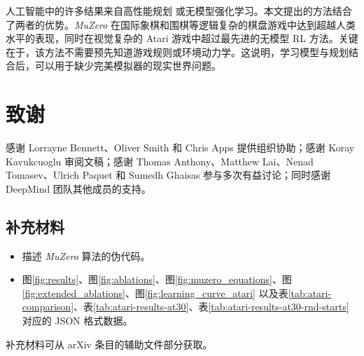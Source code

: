 \documentclass{article}
\newcommand{\muzero}{\emph{MuZero}}
\begin{document}
人工智能中的许多结果来自高性能规划\cite{campbell:deep-blue, Silver16AG, Silver18AZ} 或无模型强化学习\cite{dqn, openai_dota, alphastar}。本文提出的方法结合了两者的优势。\muzero{} 在国际象棋和围棋等逻辑复杂的棋盘游戏中达到超越人类水平的表现，同时在视觉复杂的 Atari 游戏中超过最先进的无模型 RL 方法。关键在于，该方法不需要预先知道游戏规则或环境动力学。这说明，学习模型与规划结合后，可以用于缺少完美模拟器的现实世界问题。

\section{致谢}

感谢 Lorrayne Bennett、Oliver Smith 和 Chris Apps 提供组织协助；感谢 Koray Kavukcuoglu 审阅文稿；感谢 Thomas Anthony、Matthew Lai、Nenad Tomasev、Ulrich Paquet 和 Sumedh Ghaisas 参与多次有益讨论；同时感谢 DeepMind 团队其他成员的支持。

%
%

%

%

%
%
%

%
%




\setcounter{table}{0}
\renewcommand{\thetable}{S\arabic{table}}%
\setcounter{figure}{0}
\renewcommand{\thefigure}{S\arabic{figure}}%

\subsection*{补充材料}

\begin{itemize}
\item 描述 \muzero{} 算法的伪代码。
\item 图\ref{fig:results}、图\ref{fig:ablations}、图\ref{fig:muzero_equations}、图\ref{fig:extended_ablations}、图\ref{fig:learning_curve_atari} 以及表\ref{tab:atari-comparison}、表\ref{tab:atari-results-at30}、表\ref{tab:atari-results-at30-rnd-starts} 对应的 JSON 格式数据。
\end{itemize}

补充材料可从 arXiv 条目的辅助文件部分获取。
\end{document}
